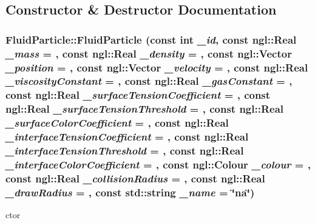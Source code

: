 \subsection{Constructor \& Destructor Documentation}
\hypertarget{class_fluid_particle_a78948d812fd65d8e536ad7f10a20e695}{
\subsubsection[{FluidParticle}]{\setlength{\rightskip}{0pt plus 5cm}FluidParticle::FluidParticle (const int {\em \_\-id}, \/  const ngl::Real {\em \_\-mass} = {}, \/  const ngl::Real {\em \_\-density} = {}, \/  const ngl::Vector {\em \_\-position} = {}, \/  const ngl::Vector {\em \_\-velocity} = {}, \/  const ngl::Real {\em \_\-viscosityConstant} = {}, \/  const ngl::Real {\em \_\-gasConstant} = {}, \/  const ngl::Real {\em \_\-surfaceTensionCoefficient} = {}, \/  const ngl::Real {\em \_\-surfaceTensionThreshold} = {}, \/  const ngl::Real {\em \_\-surfaceColorCoefficient} = {}, \/  const ngl::Real {\em \_\-interfaceTensionCoefficient} = {}, \/  const ngl::Real {\em \_\-interfaceTensionThreshold} = {}, \/  const ngl::Real {\em \_\-interfaceColorCoefficient} = {}, \/  const ngl::Colour {\em \_\-colour} = {}, \/  const ngl::Real {\em \_\-collisionRadius} = {}, \/  const ngl::Real {\em \_\-drawRadius} = {}, \/  const std::string {\em \_\-name} = {\ttfamily \char`\"{}na\char`\"{}})}}
\label{class_fluid_particle_a78948d812fd65d8e536ad7f10a20e695}


ctor 


